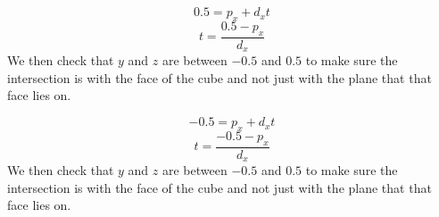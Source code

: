 \documentclass[10pt,twocolumn]{article}
\begin{document}
\begin{framed}
\\\\
\[0.5 = p_x + d_x t\]
\[t = \frac{0.5 - p_x}{d_x} \]
We then check that $y$ and $z$ are between $-0.5$ and $0.5$ to make sure the intersection is with the face of the cube and not just with the plane that that face lies on.
\end{framed}
\begin{framed}
\[-0.5 = p_x + d_x t\]
\[t = \frac{-0.5 - p_x}{d_x} \]
We then check that $y$ and $z$ are between $-0.5$ and $0.5$ to make sure the intersection is with the face of the cube and not just with the plane that that face lies on.
\end{framed}
\end{document}
